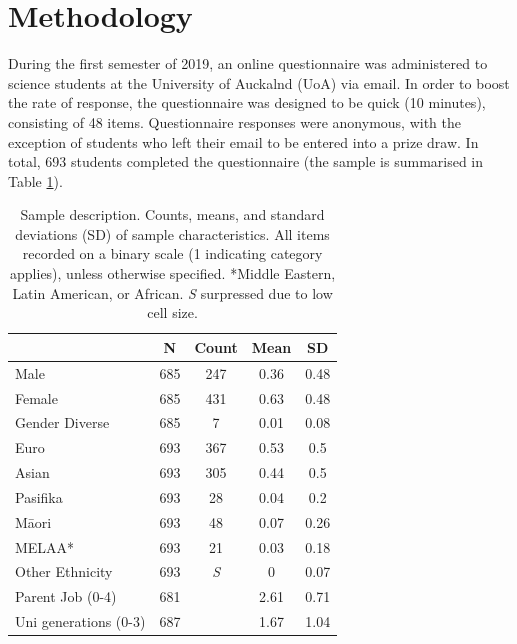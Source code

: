 \documentclass[smallextended]{svjour3}       %
\begin{document}
\section*{Methodology}
\label{method}
During the first semester of 2019, an online questionnaire was administered to science students at the University of Auckalnd (UoA) via email. In order to boost the rate of response, the questionnaire was designed to be quick (10 minutes), consisting of 48 items. Questionnaire responses were anonymous, with the exception of students who left their email to be entered into a prize draw. In total, 693 students completed the questionnaire (the sample is summarised in Table \ref{tab:Sample}). 


\begin{table}[ht]
\centering

\begin{tabular}{lcccc}
\hline
                                                             & N   & Count & Mean & SD   \\ \hline
Male                                                         & 685 & 247 & 0.36 & 0.48 \\
Female                                                       & 685 & 431 & 0.63 & 0.48 \\
Gender Diverse                                               & 685 & 7 & 0.01 & 0.08 \\
Euro                                                         & 693 & 367 & 0.53 & 0.5  \\
Asian                                                        & 693 & 305 & 0.44 & 0.5  \\
Pasifika                                                      & 693 & 28 & 0.04 & 0.2  \\
M\={a}ori                                                        & 693 & 48 & 0.07 & 0.26 \\
MELAA*                                                        & 693 & 21 & 0.03 & 0.18 \\
Other Ethnicity                                               & 693 & \textit{S} & 0  & 0.07 \\
Parent Job  (0-4) &  681 & & 2.61 & 0.71 \\
Uni generations (0-3)                                        & 687 & & 1.67 & 1.04 \\ \hline
\end{tabular}
\caption{Sample description. Counts, means, and standard deviations (SD) of sample characteristics. All items recorded on a binary scale (1 indicating category applies), unless otherwise specified. *Middle Eastern, Latin American, or African. \textit{S} surpressed due to low cell size.} 
\label{tab:Sample}       %
\end{table}
\end{document}
